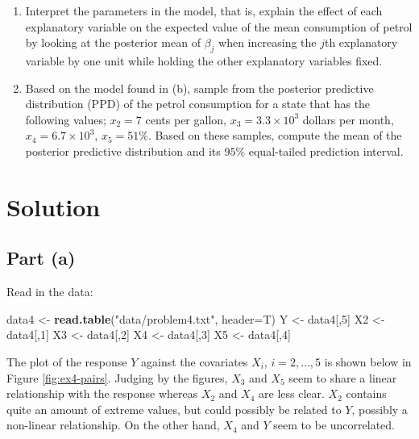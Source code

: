\documentclass[
]{homework}
\newenvironment{Shaded}{\begin{snugshade}}{\end{snugshade}}
\newcommand{\AttributeTok}[1]{\textcolor[rgb]{0.13,0.29,0.53}{#1}}
\newcommand{\DecValTok}[1]{\textcolor[rgb]{0.00,0.00,0.81}{#1}}
\newcommand{\FunctionTok}[1]{\textcolor[rgb]{0.13,0.29,0.53}{\textbf{#1}}}
\newcommand{\NormalTok}[1]{#1}
\newcommand{\OtherTok}[1]{\textcolor[rgb]{0.56,0.35,0.01}{#1}}
\newcommand{\StringTok}[1]{\textcolor[rgb]{0.31,0.60,0.02}{#1}}
\begin{document}
\begin{enumerate}[label = (\alph*)]
  \item Interpret the parameters in the model, that is, explain the effect of each explanatory variable on the expected value of the mean consumption of petrol by looking at
  the posterior mean of $\beta_j$ when increasing the $j$th explanatory variable by one unit while holding the other explanatory variables fixed.
  
  \item Based on the model found in (b), sample from the posterior predictive distribution (PPD) of the petrol consumption for a state that has the following values; $x_2 = 7$ cents
  per gallon, $x_3 = 3.3 \times 10^3$ dollars per month, $x_4 = 6.7 \times 10^3$, $x_5 = 51\%$. Based on these samples, compute the mean of the posterior predictive distribution and
  its $95\%$ equal-tailed prediction interval.
\end{enumerate}

\section{Solution}\label{solution-3}

\subsection{Part (a)}\label{part-a-3}

Read in the data:

\begin{Shaded}
\begin{Highlighting}[]
\NormalTok{data4 }\OtherTok{\textless{}{-}} \FunctionTok{read.table}\NormalTok{(}\StringTok{"data/problem4.txt"}\NormalTok{, }\AttributeTok{header=}\NormalTok{T)}
\NormalTok{Y }\OtherTok{\textless{}{-}}\NormalTok{ data4[,}\DecValTok{5}\NormalTok{] }
\NormalTok{X2 }\OtherTok{\textless{}{-}}\NormalTok{ data4[,}\DecValTok{1}\NormalTok{]}
\NormalTok{X3 }\OtherTok{\textless{}{-}}\NormalTok{ data4[,}\DecValTok{2}\NormalTok{]}
\NormalTok{X4 }\OtherTok{\textless{}{-}}\NormalTok{ data4[,}\DecValTok{3}\NormalTok{]}
\NormalTok{X5 }\OtherTok{\textless{}{-}}\NormalTok{ data4[,}\DecValTok{4}\NormalTok{]}
\end{Highlighting}
\end{Shaded}

The plot of the response \(Y\) against the covariates \(X_i\), \(i = 2, \ldots, 5\) is shown below in Figure \ref{fig:ex4-pairs}.
Judging by the figures, \(X_3\) and \(X_5\) seem to share a linear relationship with the response whereas \(X_2\) and \(X_4\) are less clear.
\(X_2\) contains quite an amount of extreme values, but could possibly be related to \(Y\), possibly a non-linear relationship. On the other hand, \(X_4\) and \(Y\) seem to be
uncorrelated.
\end{document}
